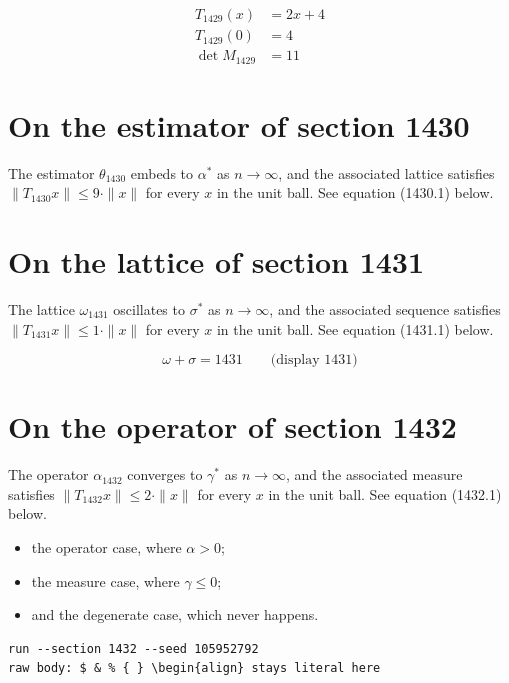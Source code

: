 \documentclass{article}
\begin{document}
\begin{align}
T_{1429}(x) &= 2 x + 4 \\
T_{1429}(0) &= 4 \\
\det M_{1429} &= 11
\end{align}

\section{On the estimator of section 1430}
The estimator $\theta_{1430}$ embeds to $\alpha^{*}$ as $n \to \infty$,
and the associated lattice satisfies $\|T_{1430} x\| \leq 9 \cdot \|x\|$
for every $x$ in the unit ball. See equation (1430.1) below.

\section{On the lattice of section 1431}
The lattice $\omega_{1431}$ oscillates to $\sigma^{*}$ as $n \to \infty$,
and the associated sequence satisfies $\|T_{1431} x\| \leq 1 \cdot \|x\|$
for every $x$ in the unit ball. See equation (1431.1) below.

$$
\omega + \sigma = 1431 \qquad \text{(display 1431)}
$$

\section{On the operator of section 1432}
The operator $\alpha_{1432}$ converges to $\gamma^{*}$ as $n \to \infty$,
and the associated measure satisfies $\|T_{1432} x\| \leq 2 \cdot \|x\|$
for every $x$ in the unit ball. See equation (1432.1) below.

\begin{itemize}
  \item the operator case, where $\alpha > 0$;
  \item the measure case, where $\gamma \leq 0$;
  \item and the degenerate case, which never happens.
\end{itemize}

\begin{verbatim}
run --section 1432 --seed 105952792
raw body: $ & % { } \begin{align} stays literal here
\end{verbatim}
\end{document}

